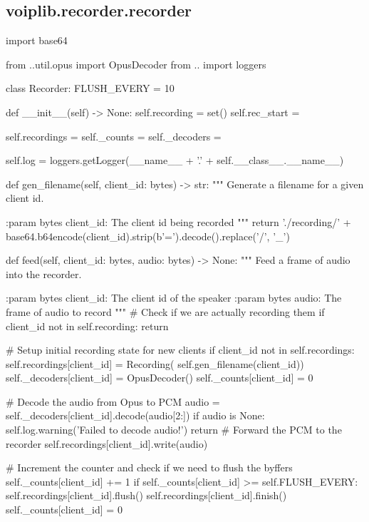 \subsection{voiplib.recorder.recorder}
\begin{pythoncode}
import base64

from ..util.opus import OpusDecoder
from .. import loggers


class Recorder:
    FLUSH_EVERY = 10

    def __init__(self) -> None:
        self.recording = set()
        self.rec_start = {}

        self.recordings = {}
        self._counts = {}
        self._decoders = {}

        self.log = loggers.getLogger(__name__ + '.' + self.__class__.__name__)
    
    def gen_filename(self, client_id: bytes) -> str:
        """
        Generate a filename for a given client id.
        
        :param bytes client_id: The client id being recorded
        """
        return './recording/' + base64.b64encode(client_id).strip(b'=').decode().replace('/', '_')

    def feed(self, client_id: bytes, audio: bytes) -> None:
        """
        Feed a frame of audio into the recorder.

        :param bytes client_id: The client id of the speaker
        :param bytes audio: The frame of audio to record
        """
        # Check if we are actually recording them
        if client_id not in self.recording:
            return

        # Setup initial recording state for new clients
        if client_id not in self.recordings:
            self.recordings[client_id] = Recording(
                self.gen_filename(client_id))
            self._decoders[client_id] = OpusDecoder()
            self._counts[client_id] = 0
        
        # Decode the audio from Opus to PCM
        audio = self._decoders[client_id].decode(audio[2:])
        if audio is None:
            self.log.warning('Failed to decode audio!')
            return
        # Forward the PCM to the recorder
        self.recordings[client_id].write(audio)

        # Increment the counter and check if we need to flush the byffers
        self._counts[client_id] += 1
        if self._counts[client_id] >= self.FLUSH_EVERY:
            self.recordings[client_id].flush()
            self.recordings[client_id].finish()
            self._counts[client_id] = 0
\end{pythoncode}
